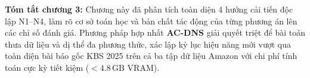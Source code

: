\noindent \textbf{Tóm tắt chương 3:} Chương này đã phân tích toàn diện 4 hướng cải tiến độc lập N1--N4, làm rõ cơ sở toán học và bản chất tác động của từng phương án lên các chỉ số đánh giá. Phương pháp hợp nhất \textbf{AC-DNS} giải quyết triệt để bài toán thưa dữ liệu và dị thể đa phương thức, xác lập kỷ lục hiệu năng mới vượt qua toàn diện bài báo gốc KBS 2025 trên cả ba tập dữ liệu Amazon với chi phí tính toán cực kỳ tiết kiệm ($<4.8$\,GB VRAM).

